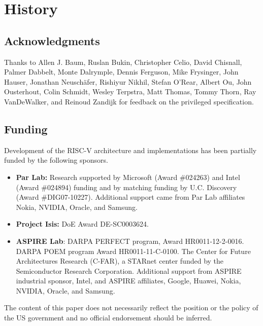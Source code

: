 \chapter{History}

\section*{Acknowledgments}

Thanks to Allen J. Baum, Ruslan Bukin, Christopher Celio, David
Chisnall, Palmer Dabbelt, Monte Dalrymple, Dennis Ferguson, Mike
Frysinger, John Hauser, Jonathan Neusch{\"a}fer, Rishiyur Nikhil, Stefan O'Rear,
Albert Ou, John Ousterhout, Colin Schmidt, Wesley Terpstra, Matt
Thomas, Tommy Thorn, Ray VanDeWalker, and Reinoud Zandijk for feedback
on the privileged specification.

\section{Funding}

Development of the RISC-V architecture and implementations has been
partially funded by the following sponsors.
\begin{itemize}
\item {\bf Par Lab:} Research supported by Microsoft (Award \#024263)
  and Intel (Award \#024894) funding and by matching funding by
  U.C. Discovery (Award \#DIG07-10227). Additional support came from
  Par Lab affiliates Nokia, NVIDIA, Oracle, and Samsung.

\item {\bf Project Isis:} DoE Award DE-SC0003624.

\item {\bf ASPIRE Lab}: DARPA PERFECT program, Award HR0011-12-2-0016.
  DARPA POEM program Award HR0011-11-C-0100.  The Center for Future
  Architectures Research (C-FAR), a STARnet center funded by the
  Semiconductor Research Corporation.  Additional support from ASPIRE
  industrial sponsor, Intel, and ASPIRE affiliates, Google, Huawei,
  Nokia, NVIDIA, Oracle, and Samsung.
\end{itemize}

The content of this paper does not necessarily reflect the position or the
policy of the US government and no official endorsement should be
inferred. 
